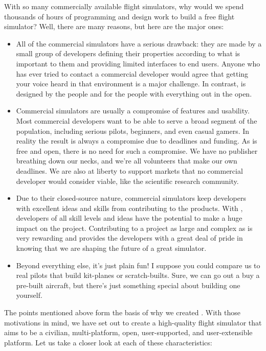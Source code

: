 With so many commercially available flight simulators, why would we spend
thousands of hours of programming and design work to build a free flight
simulator?  Well, there are many reasons, but here are the major ones:

\begin{itemize}
 \item All of the commercial simulators have a serious drawback: they are made
 by a small group of developers defining their properties according to what
 is important to them and providing limited interfaces to end users.  Anyone
 who has ever tried to contact a commercial developer would agree that getting
 your voice heard in that environment is a major challenge.  In contrast,
 \FlightGear{} is designed by the people and for the people with everything
 out in the open.
 \item Commercial simulators are usually a compromise of features and
 usability.  Most commercial developers want to be able to serve a broad
 segment of the population, including serious pilots, beginners, and even
 casual gamers.  In reality the result is always a compromise due to deadlines
 and funding.  As \FlightGear{} is free and open, there is no need for such a
 compromise.  We have no publisher breathing down our necks, and we're all
 volunteers that make our own deadlines.  We are also at liberty to support
 markets that no commercial developer would consider viable, like the
 scientific research community.
 \item Due to their closed-source nature, commercial simulators keep developers
 with excellent ideas and skills from contributing to the products.  With
 \FlightGear{}, developers of all skill levels and ideas have the potential
 to make a huge impact on the project.  Contributing to a project as large
 and complex as \FlightGear{} is very rewarding and provides the developers
 with a great deal of pride in knowing that we are shaping the future of a
 great simulator.
 \item Beyond everything else, it's just plain fun!  I suppose you could
 compare us to real pilots that build kit-planes or scratch-builts.  Sure,
 we can go out a buy a pre-built aircraft, but there's just something special
 about building one yourself.
\end{itemize}

The points mentioned above form the basis of why we created \FlightGear{}.
With those motivations in mind, we have set out to create a high-quality
flight simulator that aims to be a civilian,
multi-platform, open,
user-supported, and user-extensible platform.  Let us take a closer look at each of these
characteristics:

